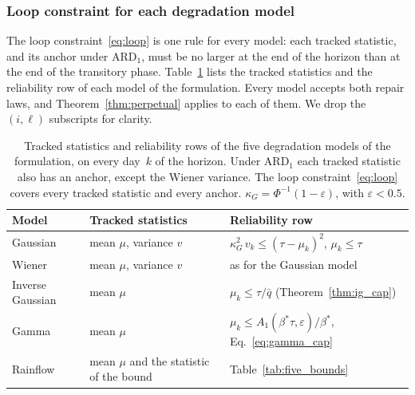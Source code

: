 \documentclass[11pt,a4paper]{article}
\theoremstyle{plain}
\theoremstyle{definition}
\theoremstyle{remark}
\begin{document}
\subsubsection{Loop constraint for each degradation model}
\label{sec:loop_per_model}

The loop constraint~\eqref{eq:loop} is one rule for every model: each tracked statistic, and its anchor under $\text{ARD}_1$, must be no larger at the end of the horizon than at the end of the transitory phase.
Table~\ref{tab:loop_per_model} lists the tracked statistics and the reliability row of each model of the formulation.
Every model accepts both repair laws, and Theorem~\ref{thm:perpetual} applies to each of them.
We drop the $(i,\ell)$ subscripts for clarity.

\begin{table}[htbp]
\centering
\caption{Tracked statistics and reliability rows of the five degradation models of the formulation, on every day~$k$ of the horizon.
Under $\text{ARD}_1$ each tracked statistic also has an anchor, except the Wiener variance.
The loop constraint~\eqref{eq:loop} covers every tracked statistic and every anchor.
$\kappa_G = \Phi^{-1}(1-\varepsilon)$, with $\varepsilon < 0.5$.}
\label{tab:loop_per_model}
\small
\begin{tabular}{@{}lll@{}}
\toprule
\textbf{Model} & \textbf{Tracked statistics} & \textbf{Reliability row} \\
\midrule
Gaussian         & mean $\mu$, variance $v$ & $\kappa_G^2\, v_k \le (\tau - \mu_k)^2$, \quad $\mu_k \le \tau$ \\
Wiener           & mean $\mu$, variance $v$ & as for the Gaussian model \\
Inverse Gaussian & mean $\mu$ & $\mu_k \le \tau/\bar q$ (Theorem~\ref{thm:ig_cap}) \\
Gamma            & mean $\mu$ & $\mu_k \le A_1(\beta^*\tau, \varepsilon)/\beta^*$, Eq.~\eqref{eq:gamma_cap} \\
Rainflow         & mean $\mu$ and the statistic of the bound & Table~\ref{tab:five_bounds} \\
\bottomrule
\end{tabular}
\end{table}
\end{document}
